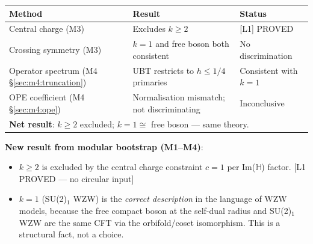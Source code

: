 \documentclass[12pt,a4paper]{article}
\theoremstyle{definition}
\theoremstyle{remark}
\begin{document}
\begin{center}
\renewcommand{\arraystretch}{1.3}
\begin{tabular}{lll}
\toprule
Method & Result & Status \\
\midrule
Central charge (M3) & Excludes $k \geq 2$ & [L1] PROVED \\
Crossing symmetry (M3) & $k=1$ and free boson both consistent & No discrimination \\
Operator spectrum (M4 §\ref{sec:m4:truncation}) & UBT restricts to $h \leq 1/4$ primaries & Consistent with $k=1$ \\
OPE coefficient (M4 §\ref{sec:m4:ope}) & Normalisation mismatch; not discriminating & Inconclusive \\
\midrule
\multicolumn{3}{l}{\textbf{Net result}: $k \geq 2$ excluded; $k = 1 \cong$ free boson — same theory.} \\
\bottomrule
\end{tabular}
\end{center}

\begin{resultbox}
\textbf{New result from modular bootstrap (M1–M4)}:
\begin{itemize}
  \item $k \geq 2$ is excluded by the central charge constraint $c = 1$ per
        Im($\mathbb{H}$) factor. [L1 PROVED — no circular input]
  \item $k = 1$ (SU(2)$_1$ WZW) is the \emph{correct description} in the
        language of WZW models, because the free compact boson at the
        self-dual radius and SU(2)$_1$ WZW are the same CFT via the
        orbifold/coset isomorphism.  This is a structural fact, not a choice.
\end{itemize}
\end{resultbox}
\end{document}
